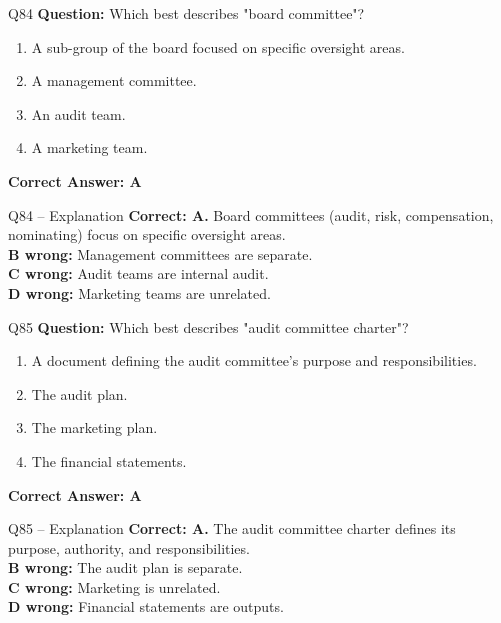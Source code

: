 \documentclass[aspectratio=169,10pt]{beamer}
\begin{document}
	\begin{frame}[t]{Q84}
		\small
		\textbf{Question:} Which best describes "board committee"?
		\begin{enumerate}[label=\Alph*.,itemsep=1pt,topsep=2pt]
			\item A sub-group of the board focused on specific oversight areas.
			\item A management committee.
			\item An audit team.
			\item A marketing team.
		\end{enumerate}
		\vspace{4pt}
		\textbf{Correct Answer: A}
	\end{frame}
	
	\begin{frame}[t]{Q84 -- Explanation}
		\small
		\textbf{Correct: A.} Board committees (audit, risk, compensation, nominating) focus on specific oversight areas. \\[4pt]
		\textbf{B wrong:} Management committees are separate. \\[2pt]
		\textbf{C wrong:} Audit teams are internal audit. \\[2pt]
		\textbf{D wrong:} Marketing teams are unrelated.
	\end{frame}
	
	\begin{frame}[t]{Q85}
		\small
		\textbf{Question:} Which best describes "audit committee charter"?
		\begin{enumerate}[label=\Alph*.,itemsep=1pt,topsep=2pt]
			\item A document defining the audit committee's purpose and responsibilities.
			\item The audit plan.
			\item The marketing plan.
			\item The financial statements.
		\end{enumerate}
		\vspace{4pt}
		\textbf{Correct Answer: A}
	\end{frame}
	
	\begin{frame}[t]{Q85 -- Explanation}
		\small
		\textbf{Correct: A.} The audit committee charter defines its purpose, authority, and responsibilities. \\[4pt]
		\textbf{B wrong:} The audit plan is separate. \\[2pt]
		\textbf{C wrong:} Marketing is unrelated. \\[2pt]
		\textbf{D wrong:} Financial statements are outputs.
	\end{frame}
	
\end{document}
